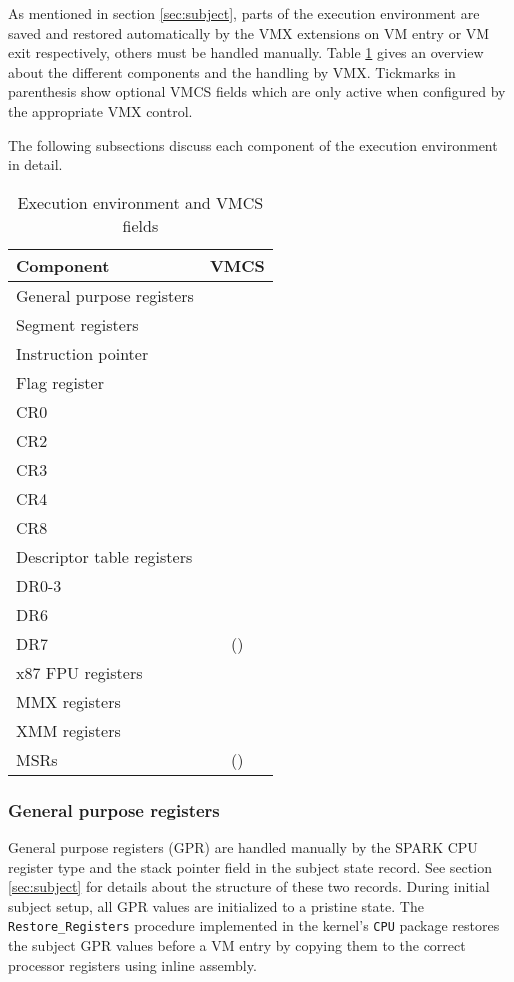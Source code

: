 As mentioned in section \ref{sec:subject}, parts of the execution environment
are saved and restored automatically by the VMX extensions on VM entry or VM
exit respectively, others must be handled manually. Table
\ref{tab:exec-env-storage} gives an overview about the different components and
the handling by VMX. Tickmarks in parenthesis show optional VMCS fields which
are only active when configured by the appropriate VMX control.

The following subsections discuss each component of the execution environment in
detail.

\begin{table}[h]
	\centering
	\begin{tabular}{l|c}
		\textbf{Component} & \textbf{VMCS} \\
		\hline
		General purpose registers  & \\
		Segment registers          & \checkmark \\
		Instruction pointer        & \checkmark \\
		Flag register              & \checkmark \\
		CR0                        & \checkmark \\
		CR2                        & \\
		CR3                        & \checkmark \\
		CR4                        & \checkmark \\
		CR8                        & \\
		Descriptor table registers & \checkmark \\
		DR0-3                      & \\
		DR6                        & \\
		DR7                        & (\checkmark) \\
		x87 FPU registers          & \\
		MMX registers              & \\
		XMM registers              & \\
		MSRs                       & (\checkmark) \\
		\hline
	\end{tabular}
	\caption{Execution environment and VMCS fields}
	\label{tab:exec-env-storage}
\end{table}

\subsubsection{General purpose registers}
General purpose registers (GPR) are handled manually by the SPARK CPU
register type and the stack pointer field in the subject state record. See
section \ref{sec:subject} for details about the structure of these two records.
During initial subject setup, all GPR values are initialized to a pristine
state. The \texttt{Restore\_Registers} procedure implemented in the kernel's
\texttt{CPU} package restores the subject GPR values before a VM entry by
copying them to the correct processor registers using inline assembly.

